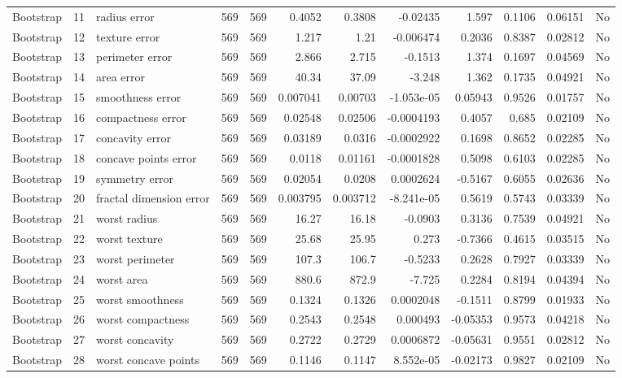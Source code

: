 \begin{longtable}{lrp{}rrrrrrrrl}
Bootstrap & 11 & radius error & 569 & 569 & 0.4052 & 0.3808 & -0.02435 & 1.597 & 0.1106 & 0.06151 & No \\
Bootstrap & 12 & texture error & 569 & 569 & 1.217 & 1.21 & -0.006474 & 0.2036 & 0.8387 & 0.02812 & No \\
Bootstrap & 13 & perimeter error & 569 & 569 & 2.866 & 2.715 & -0.1513 & 1.374 & 0.1697 & 0.04569 & No \\
Bootstrap & 14 & area error & 569 & 569 & 40.34 & 37.09 & -3.248 & 1.362 & 0.1735 & 0.04921 & No \\
Bootstrap & 15 & smoothness error & 569 & 569 & 0.007041 & 0.00703 & -1.053e-05 & 0.05943 & 0.9526 & 0.01757 & No \\
Bootstrap & 16 & compactness error & 569 & 569 & 0.02548 & 0.02506 & -0.0004193 & 0.4057 & 0.685 & 0.02109 & No \\
Bootstrap & 17 & concavity error & 569 & 569 & 0.03189 & 0.0316 & -0.0002922 & 0.1698 & 0.8652 & 0.02285 & No \\
Bootstrap & 18 & concave points error & 569 & 569 & 0.0118 & 0.01161 & -0.0001828 & 0.5098 & 0.6103 & 0.02285 & No \\
Bootstrap & 19 & symmetry error & 569 & 569 & 0.02054 & 0.0208 & 0.0002624 & -0.5167 & 0.6055 & 0.02636 & No \\
Bootstrap & 20 & fractal dimension error & 569 & 569 & 0.003795 & 0.003712 & -8.241e-05 & 0.5619 & 0.5743 & 0.03339 & No \\
Bootstrap & 21 & worst radius & 569 & 569 & 16.27 & 16.18 & -0.0903 & 0.3136 & 0.7539 & 0.04921 & No \\
Bootstrap & 22 & worst texture & 569 & 569 & 25.68 & 25.95 & 0.273 & -0.7366 & 0.4615 & 0.03515 & No \\
Bootstrap & 23 & worst perimeter & 569 & 569 & 107.3 & 106.7 & -0.5233 & 0.2628 & 0.7927 & 0.03339 & No \\
Bootstrap & 24 & worst area & 569 & 569 & 880.6 & 872.9 & -7.725 & 0.2284 & 0.8194 & 0.04394 & No \\
Bootstrap & 25 & worst smoothness & 569 & 569 & 0.1324 & 0.1326 & 0.0002048 & -0.1511 & 0.8799 & 0.01933 & No \\
Bootstrap & 26 & worst compactness & 569 & 569 & 0.2543 & 0.2548 & 0.000493 & -0.05353 & 0.9573 & 0.04218 & No \\
Bootstrap & 27 & worst concavity & 569 & 569 & 0.2722 & 0.2729 & 0.0006872 & -0.05631 & 0.9551 & 0.02812 & No \\
Bootstrap & 28 & worst concave points & 569 & 569 & 0.1146 & 0.1147 & 8.552e-05 & -0.02173 & 0.9827 & 0.02109 & No \\

\end{longtable}
